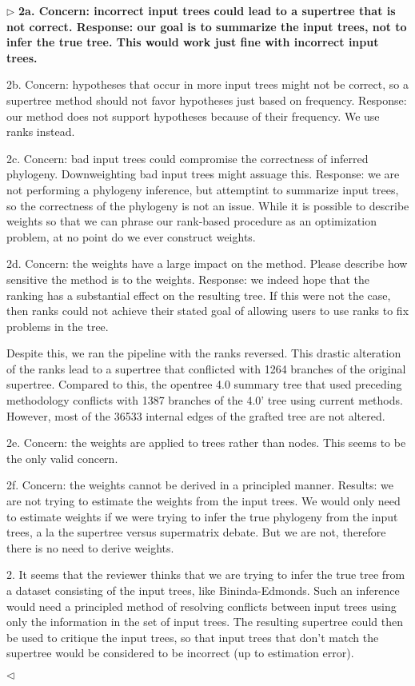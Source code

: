 \documentclass{article}
\newenvironment{reply}{$\triangleright$\bf}{$\triangleleft$}
\begin{document}
\begin{reply}
2a. Concern: incorrect input trees could lead to a supertree that is not correct.  Response: our goal is to summarize the input trees, not to infer the true tree.  This would work just fine with incorrect input trees.

2b. Concern: hypotheses that occur in more input trees might not be correct, so a supertree method should not favor hypotheses just based on frequency.  Response: our method does not support hypotheses because of their frequency.  We use ranks instead.

2c. Concern: bad input trees could compromise the correctness of inferred phylogeny.  Downweighting bad input trees might assuage this.  Response: we are not performing a phylogeny inference, but attemptint to summarize input trees, so the correctness of the phylogeny is not an issue.  While it is possible to describe weights so that we can phrase our rank-based procedure as an optimization problem, at no point do we ever construct weights.

2d. Concern: the weights have a large impact on the method.  Please describe how sensitive the method is to the weights.  Response: we indeed hope that the ranking has a substantial effect on the resulting tree.  If this were not the case, then ranks could not achieve their stated goal of allowing users to use ranks to fix problems in the tree.

Despite this, we ran the pipeline with the ranks reversed.  This drastic alteration of the ranks lead to a supertree that conflicted with 1264 branches of the original supertree.  Compared to this, the opentree 4.0 summary tree that used preceding methodology conflicts with 1387 branches of the 4.0’ tree using current methods.  However, most of the 36533 internal edges of the grafted tree are not altered. 

2e. Concern: the weights are applied to trees rather than nodes.  This seems to be the only valid concern.

2f. Concern: the weights cannot be derived in a principled manner.  Results: we are not trying to estimate the weights from the input trees.  We would only need to estimate weights if we were trying to infer the true phylogeny from the input trees, a la the supertree versus supermatrix debate.  But we are not, therefore there is no need to derive weights.

2.  It seems that the reviewer thinks that we are trying to infer the true tree from a dataset consisting of the input trees, like Bininda-Edmonds.  Such an inference would need a principled method of resolving conflicts between input trees using only the information in the set of input trees.  The resulting supertree could then be used to critique the input trees, so that input trees that don't match the supertree would be considered to be incorrect (up to estimation error).


\end{reply}
\end{document}
